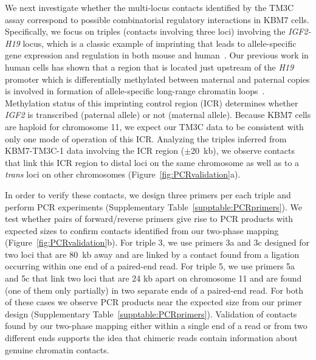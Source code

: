 We next investigate whether the multi-locus contacts identified by the TM3C
assay correspond to possible combinatorial regulatory interactions in
KBM7 cells. Specifically, we focus on triples (contacts involving three loci)
involving the \emph{IGF2-H19} locus, which is a classic example of imprinting that
leads to allele-specific gene expression and regulation in both mouse and
human~\cite{bartolomei:parental, ling:ctcf, vu:loss, murrell:interaction}.
Our previous work in human cells
has shown that a region that is located just upstream of the \emph{H19} promoter
which is differentially methylated between maternal and paternal copies is involved
in formation of allele-specific long-range chromatin loops~\cite{vu:loss}.
Methylation status of this imprinting control
region (ICR) determines whether \emph{IGF2} is transcribed (paternal allele)
or not (maternal allele). Because KBM7 cells are haploid for chromosome 11, we
expect our TM3C data to be consistent with only one mode of operation of
this ICR. Analyzing the triples inferred from KBM7-TM3C-1 data involving
the ICR region ($\pm$20~kb), we observe contacts that link this ICR region
to distal loci on the same chromosome as well as to a {\em trans} loci on
other chromosomes (Figure~\ref{fig:PCRvalidation}a).

In order to verify
these contacts, we design three primers per each triple and perform PCR
experiments (Supplementary Table~\ref{supptable:PCRprimers}).
We test whether pairs of forward/reverse primers give rise to PCR
products with expected sizes to confirm contacts identified from our
two-phase mapping (Figure~\ref{fig:PCRvalidation}b). For triple 3, we use
primers 3a and 3c designed for two loci that are 80~kb away and are linked by a
contact found from a ligation occurring within one end of a paired-end read.
For triple 5, we use primers 5a and 5c that link two loci that are 24 kb
apart on chromosome 11 and are found (one of them only partially) in two
separate ends of a paired-end read. For both of these cases we observe
PCR products near the expected size from our primer design (Supplementary Table~\ref{supptable:PCRprimers}).
Validation of contacts found by our two-phase mapping either within a
single end of a read or from two different ends supports the idea that
chimeric reads contain information about genuine chromatin contacts.

